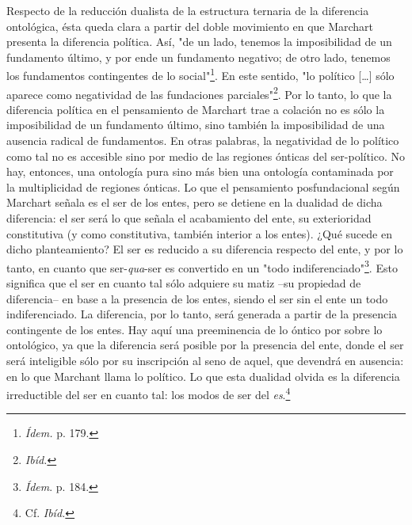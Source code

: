 \documentclass{book}
\begin{document}
Respecto de la reducción dualista de la estructura ternaria de la
diferencia ontológica, ésta queda clara a partir del doble movimiento en
que Marchart presenta la diferencia política. Así, "de un lado, tenemos
la imposibilidad de un fundamento último, y por ende un fundamento
negativo; de otro lado, tenemos los fundamentos contingentes de lo
social"\footnote{\emph{Ídem.} p. 179.}. En este sentido, "lo político
{[}\ldots{]} sólo aparece como negatividad de las fundaciones
parciales"\footnote{\emph{Ibíd.}}. Por lo tanto, lo que la diferencia
política en el pensamiento de Marchart trae a colación no es sólo la
imposibilidad de un fundamento último, sino también la imposibilidad de
una ausencia radical de fundamentos. En otras palabras, la negatividad
de lo político como tal no es accesible sino por medio de las regiones
ónticas del ser-político. No hay, entonces, una ontología pura sino más
bien una ontología contaminada por la multiplicidad de regiones ónticas.
Lo que el pensamiento posfundacional según Marchart señala es el ser de
los entes, pero se detiene en la dualidad de dicha diferencia: el ser
será lo que señala el acabamiento del ente, su exterioridad constitutiva
(y como constitutiva, también interior a los entes). ¿Qué sucede en
dicho planteamiento? El ser es reducido a su diferencia respecto del
ente, y por lo tanto, en cuanto que ser-\emph{qua}-ser es convertido en
un "todo indiferenciado"\footnote{\emph{Ídem}. p. 184.}. Esto significa
que el ser en cuanto tal sólo adquiere su matiz --su propiedad de
diferencia-- en base a la presencia de los entes, siendo el ser sin el
ente un todo indiferenciado. La diferencia, por lo tanto, será generada
a partir de la presencia contingente de los entes. Hay aquí una
preeminencia de lo óntico por sobre lo ontológico, ya que la diferencia
será posible por la presencia del ente, donde el ser será inteligible
sólo por su inscripción al seno de aquel, que devendrá en ausencia: en
lo que Marchant llama lo político. Lo que esta dualidad olvida es la
diferencia irreductible del ser en cuanto tal: los modos de ser del
\emph{es}.\footnote{Cf. \emph{Ibíd.}}
\end{document}
